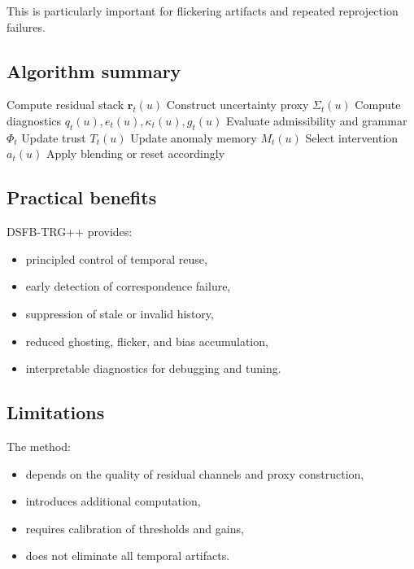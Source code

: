 \documentclass[11pt,letterpaper]{article}
\theoremstyle{gcresult}
\theoremstyle{definition}
\begin{document}
This is particularly important for flickering artifacts and repeated reprojection failures.


\subsection{Algorithm summary}

\begin{algorithm}[H]
\caption{DSFB-TRG++ Temporal Reuse}
\begin{algorithmic}[1]
    \State Compute residual stack $\mathbf r_t(u)$
    \State Construct uncertainty proxy $\Sigma_t(u)$
    \State Compute diagnostics $q_t(u), e_t(u), \kappa_t(u), g_t(u)$
    \State Evaluate admissibility and grammar $\Phi_t$
    \State Update trust $T_t(u)$
    \State Update anomaly memory $M_t(u)$
    \State Select intervention $a_t(u)$
    \State Apply blending or reset accordingly
\EndFor
\end{algorithmic}
\end{algorithm}


\subsection{Practical benefits}

DSFB-TRG++ provides:
\begin{itemize}[leftmargin=1.5em]
    \item principled control of temporal reuse,
    \item early detection of correspondence failure,
    \item suppression of stale or invalid history,
    \item reduced ghosting, flicker, and bias accumulation,
    \item interpretable diagnostics for debugging and tuning.
\end{itemize}


\subsection{Limitations}

The method:
\begin{itemize}[leftmargin=1.5em]
    \item depends on the quality of residual channels and proxy construction,
    \item introduces additional computation,
    \item requires calibration of thresholds and gains,
    \item does not eliminate all temporal artifacts.
\end{itemize}
\end{document}

